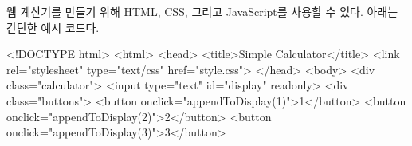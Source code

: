 \documentclass[
  letterpaper,
]{book}
\newenvironment{Shaded}{\begin{snugshade}}{\end{snugshade}}
\newcommand{\DataTypeTok}[1]{\textcolor[rgb]{0.68,0.00,0.00}{#1}}
\newcommand{\ErrorTok}[1]{\textcolor[rgb]{0.68,0.00,0.00}{#1}}
\newcommand{\KeywordTok}[1]{\textcolor[rgb]{0.00,0.23,0.31}{#1}}
\newcommand{\NormalTok}[1]{\textcolor[rgb]{0.00,0.23,0.31}{#1}}
\newcommand{\OtherTok}[1]{\textcolor[rgb]{0.00,0.23,0.31}{#1}}
\newcommand{\StringTok}[1]{\textcolor[rgb]{0.13,0.47,0.30}{#1}}
\begin{document}
\begin{tcolorbox}[enhanced jigsaw, opacityback=0, opacitybacktitle=0.6, colback=white, rightrule=.15mm, coltitle=black, colframe=quarto-callout-note-color-frame, colbacktitle=quarto-callout-note-color!10!white, bottomrule=.15mm, bottomtitle=1mm, breakable, title=\textcolor{quarto-callout-note-color}{\faInfo}\hspace{0.5em}{웹 계산기 코드 작성해줘}, titlerule=0mm, leftrule=.75mm, toptitle=1mm, left=2mm, arc=.35mm, toprule=.15mm]

웹 계산기를 만들기 위해 HTML, CSS, 그리고 JavaScript를 사용할 수 있다.
아래는 간단한 예시 코드다.

\begin{Shaded}
\begin{Highlighting}[]
\DataTypeTok{\textless{}!DOCTYPE }\NormalTok{html}\DataTypeTok{\textgreater{}}
\DataTypeTok{\textless{}}\KeywordTok{html}\DataTypeTok{\textgreater{}}
\DataTypeTok{\textless{}}\KeywordTok{head}\DataTypeTok{\textgreater{}}
  \DataTypeTok{\textless{}}\KeywordTok{title}\DataTypeTok{\textgreater{}}\NormalTok{Simple Calculator}\DataTypeTok{\textless{}/}\KeywordTok{title}\DataTypeTok{\textgreater{}}
  \DataTypeTok{\textless{}}\KeywordTok{link} \ErrorTok{rel}\OtherTok{=}\StringTok{"stylesheet"} \ErrorTok{type}\OtherTok{=}\StringTok{"text/css"} \ErrorTok{href}\OtherTok{=}\StringTok{"style.css"}\DataTypeTok{\textgreater{}}
\DataTypeTok{\textless{}/}\KeywordTok{head}\DataTypeTok{\textgreater{}}
\DataTypeTok{\textless{}}\KeywordTok{body}\DataTypeTok{\textgreater{}}
  \DataTypeTok{\textless{}}\KeywordTok{div} \ErrorTok{class}\OtherTok{=}\StringTok{"calculator"}\DataTypeTok{\textgreater{}}
    \DataTypeTok{\textless{}}\KeywordTok{input} \ErrorTok{type}\OtherTok{=}\StringTok{"text"} \ErrorTok{id}\OtherTok{=}\StringTok{"display"} \ErrorTok{readonly}\DataTypeTok{\textgreater{}}
    \DataTypeTok{\textless{}}\KeywordTok{div} \ErrorTok{class}\OtherTok{=}\StringTok{"buttons"}\DataTypeTok{\textgreater{}}
      \DataTypeTok{\textless{}}\KeywordTok{button} \ErrorTok{onclick}\OtherTok{=}\StringTok{"appendToDisplay(\textquotesingle{}1\textquotesingle{})"}\DataTypeTok{\textgreater{}}\NormalTok{1}\DataTypeTok{\textless{}/}\KeywordTok{button}\DataTypeTok{\textgreater{}}
      \DataTypeTok{\textless{}}\KeywordTok{button} \ErrorTok{onclick}\OtherTok{=}\StringTok{"appendToDisplay(\textquotesingle{}2\textquotesingle{})"}\DataTypeTok{\textgreater{}}\NormalTok{2}\DataTypeTok{\textless{}/}\KeywordTok{button}\DataTypeTok{\textgreater{}}
      \DataTypeTok{\textless{}}\KeywordTok{button} \ErrorTok{onclick}\OtherTok{=}\StringTok{"appendToDisplay(\textquotesingle{}3\textquotesingle{})"}\DataTypeTok{\textgreater{}}\NormalTok{3}\DataTypeTok{\textless{}/}\KeywordTok{button}\DataTypeTok{\textgreater{}}

\end{Highlighting}
\end{Shaded}
\end{tcolorbox}
\end{document}
